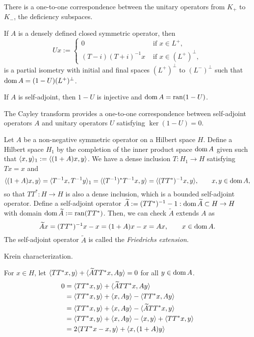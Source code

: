 \documentclass{../../large}
\begin{document}
\begin{prb}
There is a one-to-one correspondence between the unitary operators from $K_+$ to $K_-$, the deficiency subspaces.

If $A$ is a densely defined closed symmetric operator, then
\[Ux:=\begin{cases}0&\text{ if }x\in L^+,\\(T-i)(T+i)^{-1}x&\text{ if }x\in(L^+)^\perp,\end{cases}\]
is a partial isometry with initial and final spaces $(L^+)^\perp$ to $(L^-)^\perp$ such that $\operatorname{dom} A=(1-U)(L^+)^\perp$.
\begin{parts}
\item If $A$ is self-adjoint, then $1-U$ is injective and $\operatorname{dom} A=\operatorname{ran}(1-U)$.
\item The Cayley transform provides a one-to-one correspondence between self-adjoint operators $A$ and unitary operators $U$ satisfying $\ker(1-U)=0$.
\item
\end{parts}
\end{prb}


\begin{prb}
\end{prb}



\begin{prb}
Let $A$ be a non-negative symmetric operator on a Hilbert space $H$.
Define a Hilbert space $H_1$ by the completion of the inner product space $\operatorname{dom} A$ given such that $\langle x,y\rangle_1:=\langle(1+A)x,y\rangle$.
We have a dense inclusion $T:H_1\to H$ satisfying $Tx=x$ and
\[\langle(1+A)x,y\rangle=\langle T^{-1}x,T^{-1}y\rangle_1=\langle(T^{-1})^*T^{-1}x,y\rangle=\langle(TT^*)^{-1}x,y\rangle,\qquad x,y\in\operatorname{dom} A,\]
so that $TT^*:H\to H$ is also a dense inclusion, which is a bounded self-adjoint operator.
Define a self-adjoint operator $\widetilde A:=(TT^*)^{-1}-1:\operatorname{dom}\widetilde A\subset H\to H$ with domain $\operatorname{dom}\widetilde A:=\operatorname{ran}(TT^*)$.
Then, we can check $\tilde A$ extends $A$ as
\[\widetilde Ax=(TT^*)^{-1}x-x=(1+A)x-x=Ax,\qquad x\in\operatorname{dom} A.\]
The self-adjoint operator $\tilde A$ is called the \emph{Friedrichs extension}.

Krein characterization.

For $x\in H$, let $\langle TT^*x,y\rangle+\langle\widetilde ATT^*x,Ay\rangle=0$ for all $y\in\operatorname{dom} A$.
\begin{align*}
0&=\langle TT^*x,y\rangle+\langle\widetilde ATT^*x,Ay\rangle\\
&=\langle TT^*x,y\rangle+\langle x,Ay\rangle-\langle TT^*x,Ay\rangle\\
&=\langle TT^*x,y\rangle+\langle x,Ay\rangle-\langle\widetilde ATT^*x,y\rangle\\
&=\langle TT^*x,y\rangle+\langle x,Ay\rangle-\langle x,y\rangle+\langle TT^*x,y\rangle\\
&=2\langle TT^*x-x,y\rangle+\langle x,(1+A)y\rangle\\
\end{align*}
\end{prb}
\end{document}
